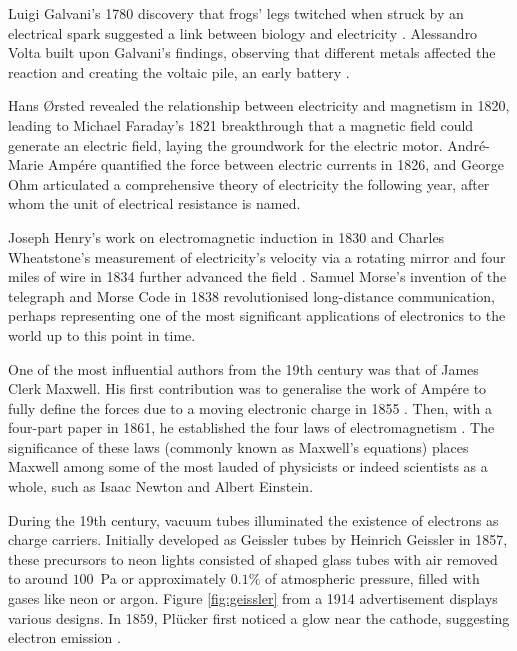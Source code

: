 \begin{refsection}
Luigi Galvani's 1780 discovery that frogs' legs twitched when struck by an electrical spark suggested a link between biology and electricity \cite{whittaker1953}. Alessandro Volta built upon Galvani's findings, observing that different metals affected the reaction and creating the voltaic pile, an early battery \cite{guarnieri2014}.

Hans Ørsted revealed the relationship between electricity and magnetism in 1820, leading to Michael Faraday's 1821 breakthrough that a magnetic field could generate an electric field, laying the groundwork for the electric motor. Andr{\'e}-Marie Amp{\'e}re quantified the force between electric currents in 1826, and George Ohm articulated a comprehensive theory of electricity the following year, after whom the unit of electrical resistance is named.

Joseph Henry's work on electromagnetic induction in 1830 and Charles Wheatstone's measurement of electricity's velocity via a rotating mirror and four miles of wire in 1834 further advanced the field \cite{Hellemans1988-ax}. Samuel Morse's invention of the telegraph and Morse Code in 1838 revolutionised long-distance communication, perhaps representing one of the most significant applications of electronics to the world up to this point in time.

One of the most influential authors from the 19th century was that of James Clerk Maxwell. His first contribution was to generalise the work of Amp{\'e}re to fully define the forces due to a moving electronic charge in 1855 \cite{maxwell1890}. Then, with a four-part paper in 1861, he established the four laws of electromagnetism \cite{maxwell2010}. The significance of these laws (commonly known as Maxwell's equations) places Maxwell among some of the most lauded of physicists or indeed scientists as a whole, such as Isaac Newton and Albert Einstein.

During the 19th century, vacuum tubes illuminated the existence of electrons as charge carriers. Initially developed as Geissler tubes by Heinrich Geissler in 1857, these precursors to neon lights consisted of shaped glass tubes with air removed to around $100$~\si{\pascal} or approximately $0.1\%$ of atmospheric pressure, filled with gases like neon or argon. Figure \ref{fig:geissler} from a 1914 advertisement displays various designs. In 1859, Pl{\"u}cker first noticed a glow near the cathode, suggesting electron emission \cite{plucker1859, plucker1862}.


\end{refsection}

